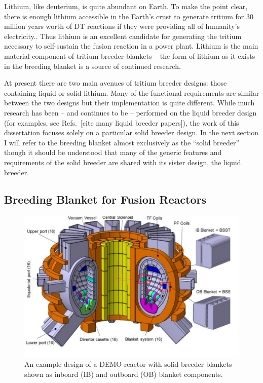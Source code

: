 Lithium, like deuterium, is quite abundant on Earth. To make the point clear, there is enough lithium accessible in the Earth's crust to generate tritium for 30 million years worth of DT reactions if they were providing all of humanity's electricity.\cite{Chen2011}. Thus lithium is an excellent candidate for generating the tritium necessary to self-sustain the fusion reaction in a power plant. Lithium is the main material component of tritium breeder blankets -- the form of lithium as it exists in the breeding blanket is a source of continued research.

At present there are two main avenues of tritium breeder designs: those containing liquid or solid lithium. Many of the functional requirements are similar between the two designs but their implementation is quite different. While much research has been -- and continues to be -- performed on the liquid breeder design (for examples, see Refs.~[cite many liquid breeder papers]), the work of this dissertation focuses solely on a particular solid breeder design. In the next section I will refer to the breeding blanket almost exclusively as the ``solid breeder'' though it should be understood that many of the generic features and requirements of the solid breeder are shared with its sister design, the liquid breeder.

\subsection{Breeding Blanket for Fusion Reactors}


\begin{figure}[ht]
	\centering
	\includegraphics[width=1\textwidth]{chapters/figures/demo} 
	\caption{An example design of a DEMO reactor with solid breeder blankets shown as inboard (IB) and outboard (OB) blanket components.}
	\label{fig:demo}
\end{figure}

